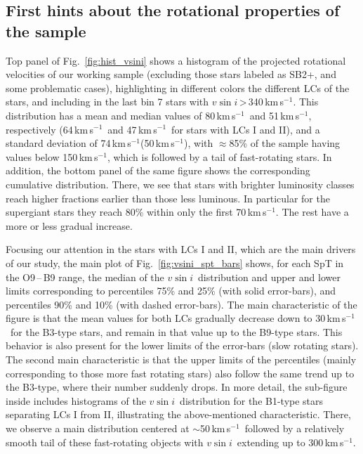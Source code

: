 \documentclass{aa}
\newcommand{\kms}{\mbox{km\,s$^{-1}$}}
\newcommand{\vsini}{\mbox{$v\sin i$}}
\begin{document}


\subsection{First hints about the rotational properties of the sample}
\label{subsection:43_TTTTTTT}

Top panel of Fig.~\ref{fig:hist_vsini} shows a histogram of the projected rotational velocities of our working sample (excluding those stars labeled as SB2+, and some problematic cases), highlighting in different colors the different LCs of the stars, and including in the last bin 7 stars with \vsini\,>\,340\,\kms. This distribution has a mean and median values of 80\,\kms\ and 51\,\kms, respectively (64\,\kms\ and 47\,\kms\ for stars with LCs I and II), and a standard deviation of 74\,\kms (50\,\kms), with $\approx$85\% of the sample having values below 150\,\kms, which is followed by a tail of fast-rotating stars. In addition, the bottom panel of the same figure shows the corresponding cumulative distribution. There, we see that stars with brighter luminosity classes reach higher fractions earlier than those less luminous. In particular for the supergiant stars they reach 80\% within only the first 70\,\kms. The rest have a more or less gradual increase.

Focusing our attention in the stars with LCs I and II, which are the main drivers of our study, the main plot of Fig.~\ref{fig:vsini_spt_bars} shows, for each SpT in the O9\,--\,B9 range, the median of the \vsini\ distribution and upper and lower limits corresponding to percentiles 75\% and 25\% (with solid error-bars), and percentiles 90\% and 10\% (with dashed error-bars). The main characteristic of the figure is that the mean values for both LCs gradually decrease down to 30\,\kms\ for the B3-type stars, and remain in that value up to the B9-type stars. This behavior is also present for the lower limits of the error-bars (slow rotating stars). The second main characteristic is that the upper limits of the percentiles (mainly corresponding to those more fast rotating stars) also follow the same trend up to the B3-type, where their number suddenly drops. In more detail, the sub-figure inside includes histograms of the \vsini\ distribution for the B1-type stars separating LCs I from II, illustrating the above-mentioned characteristic. There, we observe a main distribution centered at $\sim$50\,\kms\ followed by a relatively smooth tail of these fast-rotating objects with \vsini\ extending up to 300\,\kms.
\end{document}
